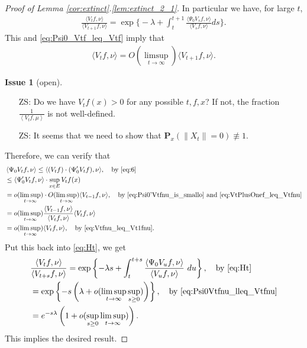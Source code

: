 \documentclass[12pt,a4paper]{amsart}
\numberwithin{equation}{section}
\theoremstyle{plain}
\theoremstyle{definition}
\newtheorem{iss}{Issue}
\begin{document}
\begin{proof}[Proof of Lemma \ref{cor:extinct}.\eqref{lem:extinct_2_1}]
In particular we have, for large $t$,
\begin{align}
\label{eq:the_magic_formula}
\frac{\langle V_tf,\nu\rangle}{\langle V_{t+1}f,\nu\rangle}
=\exp\Big\{-\lambda+\int_{t}^{t+1}\frac{\langle \Psi_0V_sf,\nu\rangle}{\langle V_sf,\nu\rangle}ds\Big\}.
\end{align}
This and \eqref{eq:Psi0_Vtf_leq_Vtf} imply that
\begin{align}
\label{eq:Vtfnu_leq_Vt1fnu}
\langle V_tf,\nu\rangle = O(\limsup_{t\to \infty}) \langle V_{t+1} f,\nu \rangle.
\end{align}
\begin{iss}[open]~
  \begin{itemize}
  \item[ZS:]
    Do we have $V_tf(x)>0$ for any possible $t,f,x$? If not, the fraction $\frac{1}{\left\langle V_tf,\mu \right\rangle}$ is not well-defined.
\item[ZS:]
It seems that we need to show that $\mathbf P_x (\|X_t\| = 0) \not\equiv 1 $.
  \end{itemize}
\end{iss}
Therefore, we can verify that
\begin{align}
\label{eq:Psi0vt_is_integrable}
&\left\langle \Psi_0 V_tf, \nu \right\rangle 
\leq \langle (V_tf) \cdot (\Psi'_0 V_tf), \nu \rangle,\quad\text{by~\eqref{eq:6}}
\\& \leq \langle \Psi'_0 V_tf,\nu\rangle  \cdot \sup_{x\in E} V_tf(x)
\\&= o(\limsup_{t\to \infty}) \cdot O(\limsup_{t\to \infty}) \langle V_{t-1}f,\nu\rangle,\quad\text{by~\eqref{eq:Psi0'Vtfnu_is_smallo} and \eqref{eq:VtPlusOnef_leq_Vtfnu}}
  \\&= o(\limsup_{t\to \infty}) \frac{\langle V_{t-1}f,\nu \rangle}{\langle V_{t}f ,\nu \rangle} \langle V_tf,\nu \rangle 
  \\& = o(\limsup_{t\to \infty})\langle V_tf,\nu \rangle,\quad\text{by~\eqref{eq:Vtfnu_leq_Vt1fnu}}. \label{eq:Psi0Vtfnu_lleq_Vtfnu}
\end{align}
Put this back into \eqref{eq:Ht}, we get
\begin{align}
&\frac{\langle V_tf,\nu\rangle}{\langle V_{t+s}f,\nu\rangle}
                = \exp \left\{-\lambda s+  \int_t^{t+s} \frac{\left\langle \Psi_0 V_u f,\nu \right\rangle}{ \left\langle V_uf, \nu \right\rangle } ~du \right\},\quad\text{by~\eqref{eq:Ht}}
  \\&=\exp\left\{-s\left(\lambda+o(\limsup_{t\to \infty} \sup_{s \geq  0})\right)\right\},\quad\text{by~\eqref{eq:Psi0Vtfnu_lleq_Vtfnu}}
\\ &= e^{-s\lambda} \left( 1+o(\sup_{s \geq 0}\limsup_{t\to \infty}) \right). 
     \label{eq:compare_with_Vtfnu_and_VtPlussfnu}
\end{align}
This implies the desired result.
\end{proof}
\end{document}
